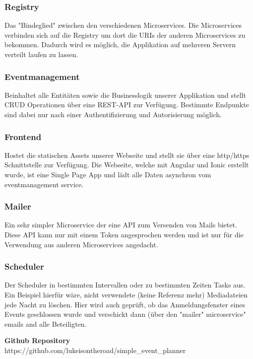 \documentclass[11pt]{article} %
\begin{document}
\subsubsection{Registry}
	Das "Bindeglied" zwischen den verschiedenen Microservices. Die Microservices verbinden sich auf die Registry um dort die URIs der anderen Microservices zu bekommen. Dadurch wird es möglich, die Applikation auf mehreren Servern verteilt laufen zu lassen.

\subsubsection{Eventmanagement}
	Beinhaltet alle Entitäten sowie die Businesslogik unserer Applikation und stellt CRUD Operationen über eine REST-API zur Verfügung. Bestimmte Endpunkte sind dabei nur nach einer Authentifizierung und Autorisierung möglich.

\subsubsection{Frontend}
	Hostet die statischen Assets unserer Webseite und stellt sie über eine http/https Schnittstelle zur Verfügung. Die Webseite, welche mit Angular und Ionic erstellt wurde, ist eine Single Page App und lädt alle Daten asynchron vom eventmanagement service.

\subsubsection{Mailer}
	Ein sehr simpler Microservice der eine API zum Versenden von Mails bietet. Diese API kann nur mit einem Token angesprochen werden und ist nur für die Verwendung aus anderen Microservices angedacht. 

\subsubsection{Scheduler}
	Der Scheduler in bestimmten Intervallen oder zu bestimmten Zeiten Tasks aus. Ein Beispiel hierfür wäre, nicht verwendete (keine Referenz mehr) Mediadateien jede Nacht zu löschen. Hier wird auch geprüft, ob das Anmeldungsfenster eines Events geschlossen wurde und verschickt dann (über den "mailer" microservice" emails and alle Beteiligten.

\newpage

\begin{appendices}

\textbf{Github Repository}\\
https://github.com/lukeisontheroad/simple\_event\_planner\\
\\

\newpage

\end{appendices}
\end{document}
